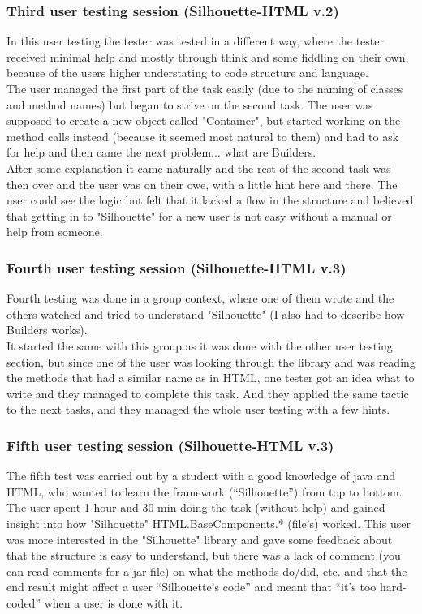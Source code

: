 \documentclass[12pt]{article}
\begin{document}
        \subsubsection{Third user testing session (Silhouette-HTML v.2)}
        In this user testing the tester was tested in a different way, where the tester received minimal help and mostly through think and some fiddling on their own, because of the users higher understating to code structure and language. \\
        The user managed the first part of the task easily (due to the naming of classes and method names) but began to strive on the second task. The user was supposed to create a new object called "Container", but started working on the method calls instead (because it seemed most natural to them) and had to ask for help and then came the next problem... what are Builders.\\
        After some explanation it came naturally and the rest of the second task was then over and the user was on their owe, with a little hint here and there. The user could see the logic but felt that it lacked a flow in the structure and believed that getting in to "Silhouette" for a new user is not easy without a manual or help from someone.
        
        \subsubsection{Fourth user testing session (Silhouette-HTML v.3)}
        Fourth testing was done in a group context, where one of them wrote and the others watched and tried to understand "Silhouette" (I also had to describe how Builders works). \\
        It started the same with this group as it was done with the other user testing section, but since one of the user was looking through the library and was reading the methods that had a similar name as in HTML, one tester got an idea what to write and they managed to complete this task. And they applied the same tactic to the next tasks, and they managed the whole user testing with a few hints. 

        \subsubsection{Fifth user testing session (Silhouette-HTML v.3)}
        The fifth test was carried out by a student with a good knowledge of java and HTML, who wanted to learn the framework (“Silhouette”) from top to bottom. The user spent 1 hour and 30 min doing the task (without help) and gained insight into how "Silhouette" HTML.BaseComponents.* (file's) worked. This user was more interested in the "Silhouette" library and gave some feedback about that the structure is easy to understand, but there was a lack of comment (you can read comments for a jar file) on what the methods do/did, etc. and that the end result might affect a user “Silhouette’s code” and meant that “it’s too hard-coded” when a user is done with it.
\end{document}
